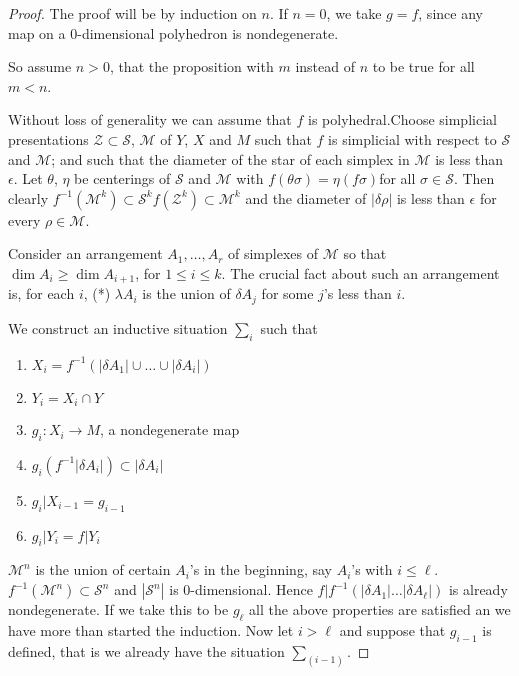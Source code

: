 \begin{proof}
The proof will be by induction on $n$. If $n=0$, we take $g=f$, since any map on a $0$-dimensional polyhedron is nondegenerate.

So assume $n>0$, that the proposition with $m$ instead of $n$ to be true for all $m<n$.

Without loss of generality we can assume that $f$ is polyhedral.\break Choose simplicial presentations $\mathscr{Z}\subset \mathscr{S}$, $\mathscr{M}$ of $Y$, $X$ and $M$ such that $f$ is simplicial with respect to $\mathscr{S}$ and $\mathscr{M}$; and such that the diameter of the star of each simplex in $\mathscr{M}$ is less than $\epsilon$. Let $\theta$, $\eta$ be centerings of $\mathscr{S}$ and $\mathscr{M}$ with $f(\theta\sigma)=\eta(f\sigma)$\pageoriginale for all $\sigma\in\mathscr{S}$. Then clearly $f^{-1}(\mathscr{M}^{k})\subset \mathscr{S}^{k}f(\mathscr{Z}^{k})\subset \mathscr{M}^{k}$ and the diameter of $|\delta \rho|$ is less than $\epsilon$ for every $\rho\in \mathscr{M}$.

Consider an arrangement $A_{1},\ldots,A_{r}$ of simplexes of $\mathscr{M}$ so that\break $\dim A_{i}\geq \dim A_{i+1}$, for $1\leq i\leq k$. The crucial fact about such an arrangement is, for each $i$, (*) $\lambda A_{i}$ is the union of $\delta A_{j}$ for some $j$'s less than $i$.

We construct an inductive situation $\sum_{i}$ such that
\begin{enumerate}
\renewcommand{\labelenumi}{(\theenumi)}
\item $X_{i}=f^{-1}(|\delta A_{1}|\cup \ldots \cup |\delta A_{i}|)$

\item $Y_{i}=X_{i}\cap Y$

\item $g_{i}:X_{i}\to M$, a nondegenerate map

\item $g_{i}(f^{-1}|\delta A_{i}|)\subset |\delta A_{i}|$

\item $g_{i}|X_{i-1}=g_{i-1}$

\item $g_{i}|Y_{i}=f|Y_{i}$ 
\end{enumerate}
\noindent
$\mathscr{M}^{n}$ is the union of certain $A_{i}$'s in the beginning, say $A_{i}$'s with $i\leq \ell$. $f^{-1}(\mathscr{M}^{n})\subset \mathscr{S}^{n}$ and $|\mathscr{S}^{n}|$ is $0$-dimensional. Hence $f|f^{-1}(|\delta A_{1}|\ldots |\delta A_{\ell}|)$ is already nondegenerate. If we take this to be $g_{\ell}$ all the above properties are satisfied an we have more than started the induction. Now let $i>\ell$ and suppose that $g_{i-1}$ is defined, that is we already have the situation $\sum_{(i-1)}$.


\end{proof}
